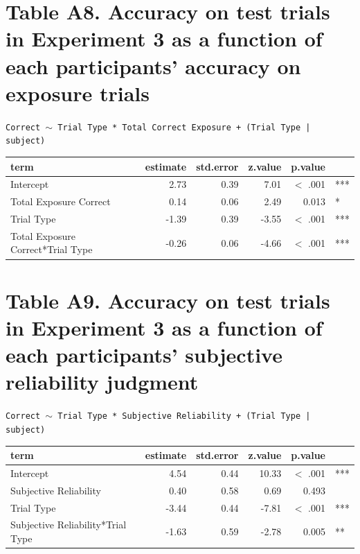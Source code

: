 \documentclass[authoryear, review]{elsarticle}
\begin{document}
\section*{Table A8. Accuracy on test trials in Experiment 3 as a function of each participants' accuracy on exposure trials}

\texttt{Correct $\sim$ Trial Type * Total Correct Exposure + (Trial Type | subject)}

\begin{table}[h]
\centering
\begin{tabular}{lrrrrl}
 term & estimate & std.error & z.value & p.value &  \\ 
  \hline
Intercept & 2.73 & 0.39 & 7.01 & $<$ .001 & *** \\ 
  Total Exposure Correct & 0.14 & 0.06 & 2.49 & 0.013 & * \\ 
  Trial Type & -1.39 & 0.39 & -3.55 & $<$ .001 & *** \\ 
  Total Exposure Correct*Trial Type & -0.26 & 0.06 & -4.66 & $<$ .001 & *** \\ 
   \hline
\end{tabular}
\label{tab:e3_acc_gaze_use}
\end{table}

\newpage

\section*{Table A9. Accuracy on test trials in Experiment 3 as a function of each participants' subjective reliability judgment}

\texttt{Correct $\sim$ Trial Type * Subjective Reliability + (Trial Type | subject)}

\begin{table}[h]
\centering
\begin{tabular}{lrrrrl}
 term & estimate & std.error & z.value & p.value &  \\ 
  \hline
Intercept & 4.54 & 0.44 & 10.33 & $<$ .001 & *** \\ 
  Subjective Reliability & 0.40 & 0.58 & 0.69 & 0.493 &  \\ 
  Trial Type & -3.44 & 0.44 & -7.81 & $<$ .001 & *** \\ 
  Subjective Reliability*Trial Type & -1.63 & 0.59 & -2.78 & 0.005 & ** \\ 
   \hline
\end{tabular}
\label{tab:e3_acc_subj_rel}
\end{table}
\end{document}
